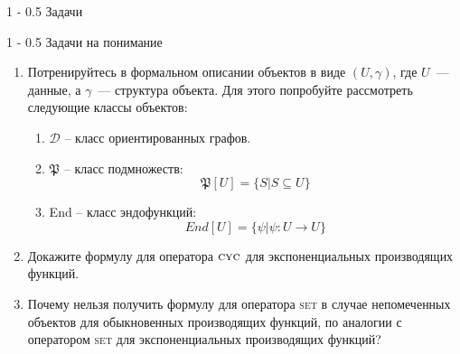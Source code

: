 \documentclass[a5paper]{article}
\makeatletter
\theoremstyle{definition}
\renewcommand{\section}{\@startsection
{section}%
{1}%
{\z@}%
{-\baselineskip}%
{0.5\baselineskip}%
{\centering\large\scshape}} %
\renewcommand{\subsection}{\@startsection
{subsection}%
{1}%
{\z@}%
{-\baselineskip}%
{0.5\baselineskip}%
{\centering\large\scshape}} %
\makeatother
\begin{document}
\section{Задачи}
            
\subsection{Задачи на понимание}
\begin{enumerate}
\item Потренируйтесь в формальном описании объектов в виде \( (U, \gamma) \), 
где \( U \)~--- данные, а \( \gamma \)~--- структура объекта. Для этого 
попробуйте рассмотреть следующие классы объектов:
\begin{enumerate}
	\item \( \mathcal D \) -- класс ориентированных графов.
	\item \( \mathfrak P \) -- класс подмножеств:
	\[
		\mathfrak P[U] = \{ S | S \subseteq U \}
	\]
	\item End -- класс эндофункций:
	\[
		End[U] = \{ \psi | \psi \colon U \to U \}
	\]
\end{enumerate}
\item Докажите формулу для оператора \( \textsc{cyc} \) для экспоненциальных 
производящих функций.
\item Почему нельзя получить формулу для оператора \textsc{set} в случае 
непомеченных объектов для обыкновенных производящих функций, по аналогии с 
оператором \textsc{set} для экспоненциальных производящих функций?
\end{enumerate}
\end{document}
